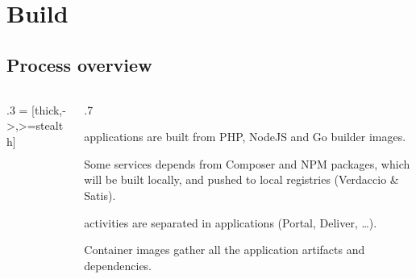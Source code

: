 \section{Build \taoce}

\subsection{Process overview}
\begin{frame}
\begin{columns}[T]
\begin{column}{.3\textwidth}
 = [thick,->,>=stealth]
\begin{center}
\end{center}
\end{column}
\begin{column}{.7\textwidth}
    \begin{description}
        \item<1->[Builder images\notcovered] \taoce applications are built from PHP, NodeJS and Go builder images.
        \item<2->[Packages\notcovered] Some services depends from Composer and NPM packages, which will be built locally, and pushed to local registries (Verdaccio \& Satis).
        \item<3->[Applications] \taoce activities are separated in applications (Portal, Deliver, \dots).
        \item<4->[Container images\notcovered] Container images gather all the application artifacts and dependencies.
    \end{description}
\end{column}
\end{columns}
\end{frame}

